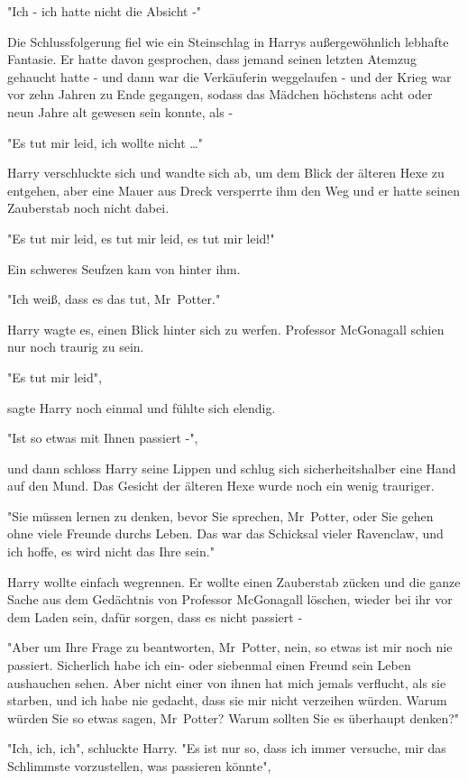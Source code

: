 {"Ich - ich hatte nicht die Absicht -"

Die Schlussfolgerung fiel wie ein Steinschlag in Harrys außergewöhnlich lebhafte Fantasie. Er hatte davon gesprochen, dass jemand seinen letzten Atemzug gehaucht hatte - und dann war die Verkäuferin weggelaufen - und der Krieg war vor zehn Jahren zu Ende gegangen, sodass das Mädchen höchstens acht oder neun Jahre alt gewesen sein konnte, als -

"Es tut mir leid, ich wollte nicht …"

Harry verschluckte sich und wandte sich ab, um dem Blick der älteren Hexe zu entgehen, aber eine Mauer aus Dreck versperrte ihm den Weg und er hatte seinen Zauberstab noch nicht dabei.

"Es tut mir leid, es tut mir leid, es tut mir leid!"

Ein schweres Seufzen kam von hinter ihm.

"Ich weiß, dass es das tut, Mr~Potter."

Harry wagte es, einen Blick hinter sich zu werfen. Professor McGonagall schien nur noch traurig zu sein.

"Es tut mir leid",

sagte Harry noch einmal und fühlte sich elendig.

"Ist so etwas mit Ihnen passiert -",

und dann schloss Harry seine Lippen und schlug sich sicherheitshalber eine Hand auf den Mund. Das Gesicht der älteren Hexe wurde noch ein wenig trauriger.

"Sie müssen lernen zu denken, bevor Sie sprechen, Mr~Potter, oder Sie gehen ohne viele Freunde durchs Leben. Das war das Schicksal vieler Ravenclaw, und ich hoffe, es wird nicht das Ihre sein."

Harry wollte einfach wegrennen. Er wollte einen Zauberstab zücken und die ganze Sache aus dem Gedächtnis von Professor McGonagall löschen, wieder bei ihr vor dem Laden sein, dafür sorgen, dass es nicht passiert -

"Aber um Ihre Frage zu beantworten, Mr~Potter, nein, so etwas ist mir noch nie passiert. Sicherlich habe ich ein- oder siebenmal einen Freund sein Leben aushauchen sehen. Aber nicht einer von ihnen hat mich jemals verflucht, als sie starben, und ich habe nie gedacht, dass sie mir nicht verzeihen würden. Warum würden Sie so etwas sagen, Mr~Potter? Warum sollten Sie es überhaupt denken?"

"Ich, ich, ich", schluckte Harry. "Es ist nur so, dass ich immer versuche, mir das Schlimmste vorzustellen, was passieren könnte",

}
